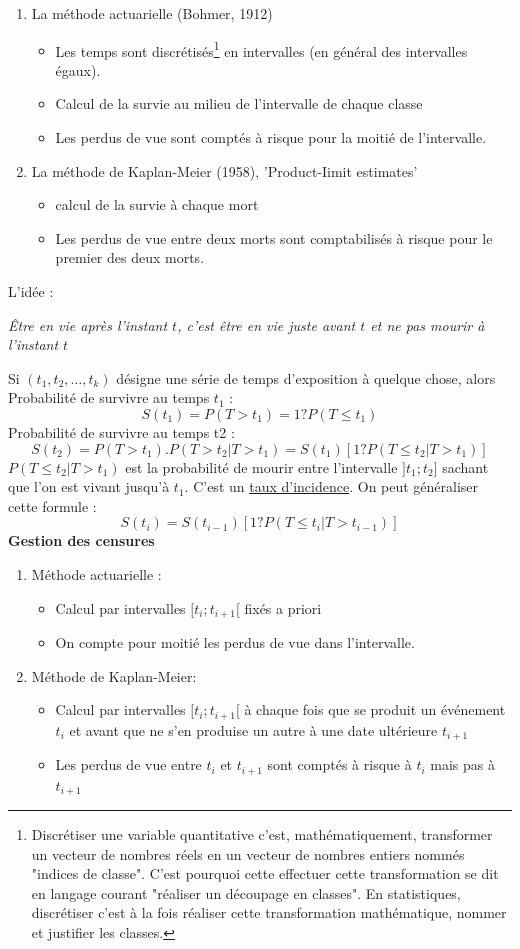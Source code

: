 \begin{enumerate}
\item La méthode actuarielle (Bohmer, 1912)
\begin{itemize}
\item Les temps sont discrétisés\footnote{Discrétiser une variable quantitative c'est, mathématiquement, transformer un vecteur de nombres réels en un vecteur de nombres entiers nommés "indices de classe". C'est pourquoi cette effectuer cette transformation se dit en langage courant "réaliser un découpage en classes". En statistiques, discrétiser c'est à la fois réaliser cette transformation mathématique, nommer et justifier les classes. } en intervalles (en général des intervalles égaux).
\item Calcul de la survie au milieu de l'intervalle de chaque classe
\item Les perdus de vue sont comptés à risque pour la moitié de l'intervalle.
\end{itemize}
\item La méthode de Kaplan-Meier (1958), 'Product-Iimit estimates'
\begin{itemize}
\item calcul de la survie à chaque mort
\item Les perdus de vue entre deux morts sont comptabilisés à risque pour le
premier des deux morts.
\end{itemize}
\end{enumerate}
L'idée : 
\begin{center}
\textit{Être en vie après l'instant $t$, c'est être en vie juste avant $t$ et ne pas mourir à l'instant $t$}
\end{center}
Si $(t_{1},t_{2},\dots,t_{k})$ désigne une série de temps d'exposition à quelque chose, alors Probabilité de survivre au temps $t_{1}$ : 
$$S(t_{1}) = P(T > t_{1}) = 1 ? P(T \leq t_{1})$$
Probabilité de survivre au temps t2 : 
$$S(t_{2}) = P(T > t_{1}) .P(T>t_{2} | T > t_{1}) = S(t_{1})[1 ? P(T\leq t_{2}| T>t_{1})]$$
$P(T \leq t_{2}| T>t_{1})$ est la probabilité de mourir entre l'intervalle $]t_{1} ; t_{2}]$ sachant que l'on est vivant jusqu'à $t_{1}$. C'est un \underline{taux d'incidence}.
On peut généraliser cette formule : 
$$ S(t_{i}) = S(t_{i-1})[1 ? P(T\leq t_{i}| T>t_{i-1})]$$
\textbf{Gestion des censures} 
\begin{enumerate}
\item Méthode actuarielle :
\begin{itemize}
\item Calcul par intervalles $[t_{i} ; t_{i+1}[$ fixés a priori
\item On compte pour moitié les perdus de vue dans l'intervalle.
\end{itemize}
\item Méthode de Kaplan-Meier:
\begin{itemize}
\item Calcul par intervalles $[t_{i} ; t_{i+1}[$ à chaque fois que se produit un événement $t_{i}$ et avant que ne s'en produise un autre à une date ultérieure $t_{i+1}$
\item Les perdus de vue entre $t_{i}$ et $t_{i+1}$ sont comptés à risque à $t_{i}$ mais pas à $t_{i+1}$
\end{itemize}
\end{enumerate}
